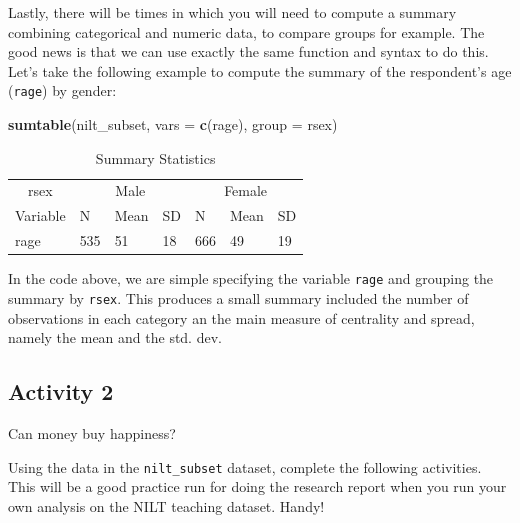 \documentclass[
]{book}
\newenvironment{Shaded}{\begin{snugshade}}{\end{snugshade}}
\newcommand{\AttributeTok}[1]{\textcolor[rgb]{0.13,0.29,0.53}{#1}}
\newcommand{\FunctionTok}[1]{\textcolor[rgb]{0.13,0.29,0.53}{\textbf{#1}}}
\newcommand{\NormalTok}[1]{#1}
\newcommand{\StringTok}[1]{\textcolor[rgb]{0.31,0.60,0.02}{#1}}
\begin{document}
Lastly, there will be times in which you will need to compute a summary combining categorical and numeric data, to compare groups for example. The good news is that we can use exactly the same function and syntax to do this. Let's take the following example to compute the summary of the respondent's age (\texttt{rage}) by gender:

\begin{Shaded}
\begin{Highlighting}[]
\FunctionTok{sumtable}\NormalTok{(nilt\_subset, }\AttributeTok{vars =} \FunctionTok{c}\NormalTok{(}\StringTok{\textquotesingle{}rage\textquotesingle{}}\NormalTok{), }\AttributeTok{group =} \StringTok{\textquotesingle{}rsex\textquotesingle{}}\NormalTok{)}
\end{Highlighting}
\end{Shaded}

\begin{table}

\caption{\label{tab:unnamed-chunk-60}Summary Statistics}
\centering
\begin{tabular}[t]{lllllll}
\toprule
\multicolumn{1}{c}{rsex} & \multicolumn{3}{c}{Male} & \multicolumn{3}{c}{Female} \\
\cmidrule(l{3pt}r{3pt}){1-1} \cmidrule(l{3pt}r{3pt}){2-4} \cmidrule(l{3pt}r{3pt}){5-7}
Variable & N & Mean & SD & N & Mean & SD\\
\midrule
rage & 535 & 51 & 18 & 666 & 49 & 19\\
\bottomrule
\end{tabular}
\end{table}

In the code above, we are simple specifying the variable \texttt{rage} and grouping the summary by \texttt{rsex}. This produces a small summary included the number of observations in each category an the main measure of centrality and spread, namely the mean and the std. dev.

\hypertarget{activity-2-1}{%
\subsection{Activity 2}\label{activity-2-1}}

Can money buy happiness?

Using the data in the \texttt{nilt\_subset} dataset, complete the following activities. This will be a good practice run for doing the research report when you run your own analysis on the NILT teaching dataset. Handy!
\end{document}
